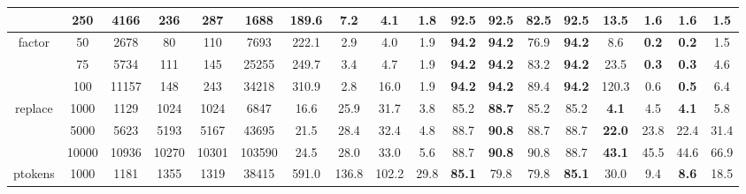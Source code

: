 \documentclass[EPiCempty]{easychair}
\begin{document}
\begin{table}
\begin{scriptsize}
\begin{tabular}{|c|c|cccc|cccc|cccc|cccc|}
                            &          250               &   4166     &    236    &    287    &    1688     &    189.6     &    7.2    &   4.1     &   1.8      &    \textbf{92.5}     &     92.5   &   82.5     &    \textbf{92.5}     &    13.5      &    1.6      &   1.6      &    \textbf{1.5}      \\
\hline
\multirow{3}{*}{factor}     &        50                 &    2678    &    80    &    110    &    7693     &    222.1     &    2.9    &   4.0     &    1.9     &    \textbf{94.2}     &   \textbf{94.2}     &   76.9     &   \textbf{94.2}      &    8.6      &     \textbf{0.2}     &    \textbf{0.2}     &    1.5      \\
                            &          75               &    5734    &    111    &    145    &    25255     &    249.7     &   3.4     &   4.7     &   1.9      &    \textbf{94.2}     &   \textbf{94.2}     &   83.2     &    \textbf{94.2}     &     23.5     &    \textbf{0.3}      &    \textbf{0.3}     &    4.6      \\
                            &          100               &   11157     &   148     &    243    &    34218     &    310.9     &    2.8    &   16.0     &    1.9     &   \textbf{94.2}      &   \textbf{94.2}     &   89.4     &    \textbf{94.2}     &    120.3      &    0.6      &    \textbf{0.5}     &    6.4      \\
\hline
\multirow{3}{*}{replace}    &          1000               &   1129     &   1024     &    1024    &    6847     &   16.6      &    25.9    &   31.7     &    3.8     &    85.2     &    \textbf{88.7}    &    85.2    &   85.2      &   \textbf{4.1}       &     4.5     &    \textbf{4.1}     &    5.8      \\
                            &         5000                &   5623     &    5193    &   5167     &    43695     &    21.5     &   28.4     &   32.4     &    4.8     &            88.7     &   \textbf{90.8}     &     88.7   &   88.7       &     \textbf{22.0}     &    23.8     &   22.4   &  31.4  \\
                            &         10000               &    10936    &    10270    &    10301    &    103590     &    24.5     &    28.0    &    33.0    &     5.6    &           88.7     &    \textbf{90.8}    &    90.8     &    88.7      &     \textbf{43.1}     &    45.5     &   44.6   &  66.9  \\
\hline
\multirow{3}{*}{ptokens}    &          1000               &   1181     &   1355     &    1319    &    38415     &   591.0      &    136.8    &   102.2    &    29.8     &    \textbf{85.1}     &   79.8   &    79.8    &   \textbf{85.1}      &   30.0       &     9.4     &    \textbf{8.6}     &    18.5      \\

\end{tabular}
\end{scriptsize}
\end{table}
\end{document}
